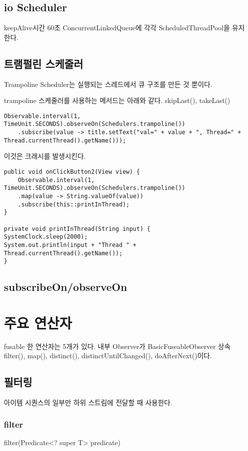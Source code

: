 \documentclass{book}
\begin{document}
{\section{io Scheduler}
keepAlive시간 60초
ConcurrentLinkedQueue에 각각 ScheduledThreadPool을 유지한다.

\section{트램펄린 스케줄러}
Trampoline Scheduler는 실행되는 스레드에서 큐 구조를 만든 것 뿐이다.

trampoline 스케줄러를 사용하는 메서드는 아래와 같다.
skipLast(), takeLast()

\begin{verbatim}
Observable.interval(1, TimeUnit.SECONDS).observeOn(Schedulers.trampoline())
	.subscribe(value -> title.setText("val=" + value + ", Thread=" + 		Thread.currentThread().getName()));
\end{verbatim}

이것은 크래시를 발생시킨다.

\begin{verbatim}
public void onClickButton2(View view) {
	Observable.interval(1, TimeUnit.SECONDS).observeOn(Schedulers.trampoline())
	.map(value -> String.valueOf(value))
	.subscribe(this::printInThread);
}

private void printInThread(String input) {
SystemClock.sleep(2000);
System.out.println(input + "Thread " + Thread.currentThread().getName());
}
\end{verbatim}

\section{subscribeOn/observeOn}


\chapter{주요 연산자}

fusable 한 연산자는 5개가 있다.
내부 Observer가 BasicFuseableObserver 상속
filter(), map(), distinct(), distinctUntilChanged(), doAfterNext()이다.

\section{필터링}
아이템 시퀀스의 일부만 하위 스트림에 전달할 때 사용한다.
\subsection{filter}
filter(Predicate<? super T> predicate)

}
\end{document}
